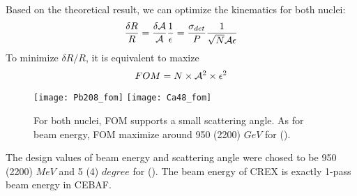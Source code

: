 Based on the theoretical result, we can optimize the kinematics for both nuclei:
\begin{equation}
    \frac{\delta R}{R} = \frac{\delta \mathcal{A}}{\mathcal{A}} \frac{1}{\epsilon} 
	= \frac{\sigma_{det}}{P} \frac{1}{\sqrt{N} \mathcal{A} \epsilon}
\end{equation}
To minimize $\delta R/R$, it is equivalent to maxize 
\begin{equation}
    FOM = N\times \mathcal{A}^2 \times \epsilon^2
\end{equation}
\begin{figure}
    \texttt{[image: Pb208\_fom]}
    \texttt{[image: Ca48\_fom]}
    \caption{For both nuclei, FOM supports a small scattering angle. As for beam energy,
    FOM maximize around 950 (2200) $GeV$ for \Pb (\Ca).}
\end{figure}

The design values of beam energy and scattering angle were chosed to be 950 (2200) $MeV$
and 5 (4) $degree$ for \Pb (\Ca). The beam energy of CREX is exactly 1-pass beam
energy in CEBAF.
\begin{comment}
    The measured asymmetry will be:
    \begin{equation*}
	\CA = \frac{2\pi}{R} \int \CA_0(\theta)R(\theta)d\theta
    \end{equation*}

    For PREX-II: average sensitivity reduced by 5\% due to ${}^{12}C$ contamination
    For CREX: average sensitivity reduced by 10\% due to ${}^{40}Ca$ contamination

    While a quartz Cerenkov detector is valued for radiation hardness and insensitivity to soft backgrounds, there is a particular challenge for few GeV electrons. In this energy range, shower fluctuations in a thick or radiated detector significantly degrade energy resolution, while photon statistics degrade the energy resolution for a thin detector. The energy resolution $\Delta E$ at nominal electron energy E increases the statistical error that one would have with infinite resolution $\sigma_0$ to obtain the total statistical error:
$$ \sigma = \sigma_0\sqrt{1+\left(\frac{\Delta E}{E}\right)^2}$$
    
Based on experience in the PREX experiment, we expect an reduction of statistical precision of a factor of 1.06 due to detector resolution.

\bigskip
Using HRS of Hall A, a \textbf{small} scattering angle maximizes the FOM. 
Given practical constraints on how low an angle ($4^\circ$) we can reach with 
septum magnets, the energy is fixed and turns out to be 2.2 GeV, which is a 
natural 1-pass beam energy for CEBAF operations in the 12 GeV era.
\end{comment}

